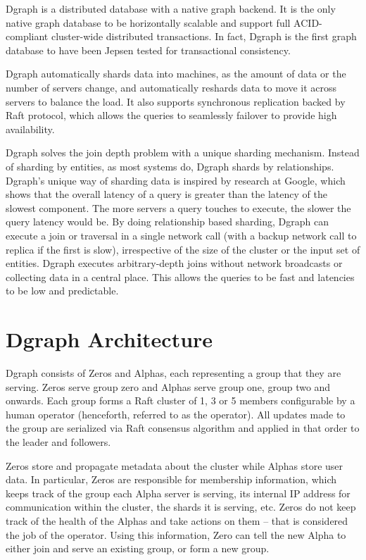 \documentclass[letterpaper,twocolumn,10pt]{article}
\begin{document}
Dgraph is a distributed database with a native graph backend. It is the only
native graph database to be horizontally scalable and support full
ACID-compliant cluster-wide distributed transactions. In fact, Dgraph is the
first graph database to have been Jepsen\cite{jepsen} tested for transactional
consistency.

Dgraph automatically shards data into machines, as the amount of data or the
number of servers change, and automatically reshards data to move it across
servers to balance the load.  It also supports synchronous replication backed by
Raft\cite{raft} protocol, which allows the queries to seamlessly failover to
provide high availability.

Dgraph solves the join depth problem with a unique sharding mechanism. Instead
of sharding by entities, as most systems do, Dgraph shards by
relationships.  Dgraph's unique way of sharding data is inspired by research at
Google\cite{latency}, which shows that the overall latency of a query is greater
than the latency of the slowest component. The more servers a query touches to
execute, the slower the query latency would be. By doing relationship based
sharding, Dgraph can execute a join or traversal in a single network call (with
a backup network call to replica if the first is slow), irrespective of the size
of the cluster or the input set of entities. Dgraph executes arbitrary-depth
joins without network broadcasts or collecting data in a central place. This
allows the queries to be fast and latencies to be low and predictable.

\section{Dgraph Architecture} \label{arch}

Dgraph consists of Zeros and Alphas, each representing a group that they are
serving. Zeros serve group zero and Alphas serve group one, group two and
onwards. Each group forms a Raft cluster of 1, 3 or 5 members configurable by a
human operator (henceforth, referred to as the operator). All updates made to
the group are serialized via Raft consensus algorithm and applied in that order
to the leader and followers.

Zeros store and propagate metadata about the cluster while Alphas store user
data. In particular, Zeros are responsible for membership information, which
keeps track of the group each Alpha server is serving, its internal IP address
for communication within the cluster, the shards it is serving, etc. Zeros do
not keep track of the health of the Alphas and take actions on them -- that is
considered the job of the operator. Using this information, Zero can tell the new
Alpha to either join and serve an existing group, or form a new group.
\end{document}
